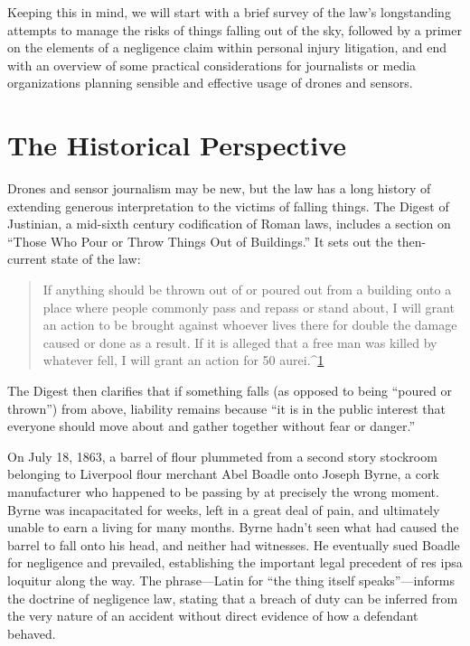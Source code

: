 \begin{itemize}
\begin{itemized}
Keeping this in mind, we will start with a brief survey of the law's longstanding
attempts to manage the risks of things falling out of the sky, followed
by a primer on the elements of a negligence claim within personal injury
litigation, and end with an overview of some practical considerations for
journalists or media organizations planning sensible and effective usage of
drones and sensors.

\section{The Historical Perspective}
Drones and sensor journalism may be new, but the law has a long history of
extending generous interpretation to the victims of falling things.
The Digest of Justinian, a mid-sixth century codification of Roman laws,
includes a section on ``Those Who Pour or Throw Things Out of Buildings.''
It sets out the then-current state of the law:
\begin{quote}
If anything should be thrown out of or poured out from a building
onto a place where people commonly pass and repass or stand
about, I will grant an action to be brought against whoever lives
 there for double the damage caused or done as a result. If it is alleged
that a free man was killed by whatever fell, I will grant an action for
50 aurei.^{\href{#endnotes-sullivan}{1}}
\end{quote}

The Digest then clarifies that if something falls (as opposed to being ``poured
or thrown'') from above, liability remains because ``it is in the public interest
that everyone should move about and gather together without fear
or danger.''

On July 18, 1863, a barrel of flour plummeted from a second story stockroom
belonging to Liverpool flour merchant Abel Boadle onto Joseph
Byrne, a cork manufacturer who happened to be passing by at precisely the
wrong moment. Byrne was incapacitated for weeks, left in a great deal of
pain, and ultimately unable to earn a living for many months. Byrne hadn't
seen what had caused the barrel to fall onto his head, and neither had witnesses.
He eventually sued Boadle for negligence and prevailed, establishing
the important legal precedent of res ipsa loquitur along the way. The
phrase—Latin for ``the thing itself speaks''—informs the doctrine of negligence
law, stating that a breach of duty can be inferred from the very nature
of an accident without direct evidence of how a defendant behaved.


\end{itemized}
\end{itemize}
